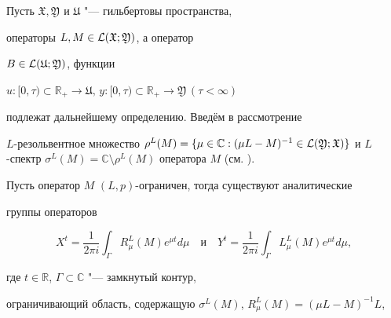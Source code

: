 


\date{01/VII/2011} %







\maketitle




Пусть $\mathfrak{ X, Y}$ и $\mathfrak U$ "--- гильбертовы пространства,

операторы $L, M \in {\cal L} (\mathfrak X; \mathfrak Y)$, а оператор

$B\in {\cal L} (\mathfrak U; \mathfrak Y)$, функции

$u: [0,\tau)\subset{\mathbb R}_{+} \rightarrow \mathfrak U,\, y: [0,\tau)\subset{\mathbb R}_{+} \rightarrow \mathfrak Y \, (\tau < \infty)$

подлежат дальнейшему определению. Введём в рассмотрение

$L$-резольвентное множество $\rho^L(M) =\{\mu\in{\mathbb C} : (\mu

L-M)^{-1}\in {\cal L} (\mathfrak Y; \mathfrak X)\}$ и $L$-спектр $\sigma^L

(M)={\mathbb C}\setminus \rho^L(M)$ оператора $M$ (см. \cite[гл. 4]{manakova:bib:monosvf}).



Пусть оператор $M$ $(L,p)$-ограничен, тогда существуют аналитические %

группы операторов

$$

X^t=\frac{1}{2\pi i}\int_\Gamma R_\mu^L (M) e^{\mu t} d\mu

\quad\mbox{и}\quad

Y^t=\frac{1}{2\pi i}\int_\Gamma L_\mu^L (M) e^{\mu t} d\mu,

$$

где $t\in\mathbb R$, $\Gamma\subset\mathbb C$ "--- замкнутый контур,

ограничивающий область, содержащую $\sigma^L (M)$, $R_\mu^L (M)=(\mu L-M)^{-1}L$,

